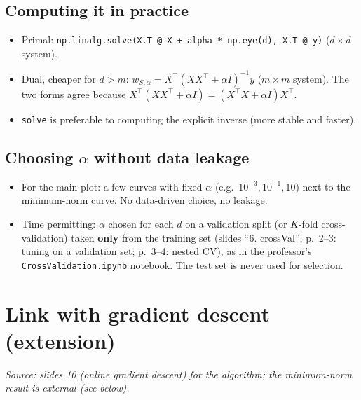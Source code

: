\documentclass[11pt,a4paper]{article}
\newcommand{\fonte}[1]{\par\noindent\textit{Source: #1}\par\smallskip}
\begin{document}
\subsection{Computing it in practice}
\begin{itemize}
  \item Primal: \texttt{np.linalg.solve(X.T @ X + alpha * np.eye(d), X.T @ y)} ($d \times d$ system).
  \item Dual, cheaper for $d > m$: $w_{S,\alpha} = X^\top(XX^\top + \alpha I)^{-1}y$ ($m\times m$ system).
        The two forms agree because $X^\top(XX^\top + \alpha I) = (X^\top X + \alpha I)X^\top$.
  \item \texttt{solve} is preferable to computing the explicit inverse (more stable and faster).
\end{itemize}

\subsection{Choosing $\alpha$ without data leakage}
\begin{itemize}
  \item For the main plot: a few curves with fixed $\alpha$ (e.g.\ $10^{-3}, 10^{-1}, 10$) next to the minimum-norm curve.
        No data-driven choice, no leakage.
  \item Time permitting: $\alpha$ chosen for each $d$ on a validation split (or $K$-fold cross-validation) taken
        \textbf{only} from the training set (slides ``6. crossVal'', p.~2--3: tuning on a validation set; p.~3--4: nested CV),
        as in the professor's \texttt{CrossValidation.ipynb} notebook.
        The test set is never used for selection.
\end{itemize}

\section{Link with gradient descent (extension)}
\fonte{slides 10 (online gradient descent) for the algorithm; the minimum-norm result is external (see below).}
\end{document}
